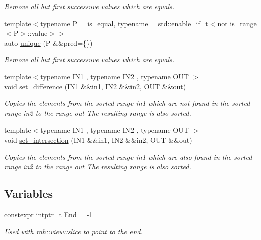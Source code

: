 \begin{DoxyCompactItemize}
\begin{DoxyCompactList}\small\item\em Remove all but first successuve values which are equals. \end{DoxyCompactList}\item 
{\footnotesize template$<$typename P  = is\+\_\+equal, typename  = std\+::enable\+\_\+if\+\_\+t$<$not is\+\_\+range$<$\+P$>$\+::value$>$$>$ }\\auto \mbox{\hyperlink{namespacerah_aafbbb6f9bd014675985d33d93221acca}{unique}} (P \&\&pred=\{\})
\begin{DoxyCompactList}\small\item\em Remove all but first successuve values which are equals. \end{DoxyCompactList}\item 
{\footnotesize template$<$typename I\+N1 , typename I\+N2 , typename O\+UT $>$ }\\void \mbox{\hyperlink{namespacerah_aca8dbcc943f7c503acea5f58f231a5af}{set\+\_\+difference}} (I\+N1 \&\&in1, I\+N2 \&\&in2, O\+UT \&\&out)
\begin{DoxyCompactList}\small\item\em Copies the elements from the sorted range in1 which are not found in the sorted range in2 to the range out The resulting range is also sorted. \end{DoxyCompactList}\item 
{\footnotesize template$<$typename I\+N1 , typename I\+N2 , typename O\+UT $>$ }\\void \mbox{\hyperlink{namespacerah_a41cb09a0285e2a6814b8aa99f90ba987}{set\+\_\+intersection}} (I\+N1 \&\&in1, I\+N2 \&\&in2, O\+UT \&\&out)
\begin{DoxyCompactList}\small\item\em Copies the elements from the sorted range in1 which are also found in the sorted range in2 to the range out The resulting range is also sorted. \end{DoxyCompactList}\end{DoxyCompactItemize}
\subsection*{Variables}
\begin{DoxyCompactItemize}
\item 
constexpr intptr\+\_\+t \mbox{\hyperlink{namespacerah_a5af06eebbd592c36368022990839b982}{End}} = -\/1
\begin{DoxyCompactList}\small\item\em Used with \mbox{\hyperlink{namespacerah_1_1view_a419374b95b3b9601655b0edf753963c3}{rah\+::view\+::slice}} to point to the end. \end{DoxyCompactList}\end{DoxyCompactItemize}


